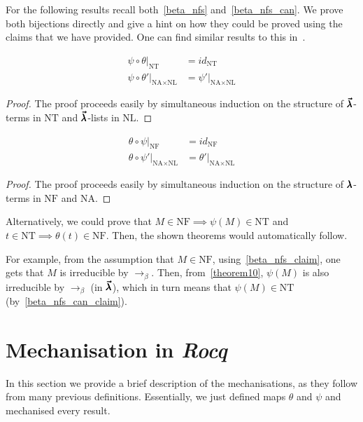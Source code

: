For the following results recall both~\cref{beta_nfs} and~\cref{beta_nfs_can}.
We prove both bijections directly and give a hint on how they could be proved using the claims that we have provided.
One can find similar results to this in~\cite{LuisDychkoff}.

\begin{theorem}
  \begin{align*}
    \psi \circ \theta |_{\text{NT}} &= id_{\text{NT}} \\
    \psi \circ \theta'|_{\text{NA} \times \text{NL}} &= \psi' |_{\text{NA} \times \text{NL}}
  \end{align*}
\end{theorem}
\begin{proof}
  The proof proceeds easily by simultaneous induction on the structure of $\pmb{\vec \lambda}$-terms in $\text{NT}$ and $\pmb{\vec \lambda}$-lists in $\text{NL}$.
\end{proof}

\begin{theorem}
  \begin{align*}
    \theta \circ \psi |_{\text{NF}} &= id_{\text{NF}} \\
    \theta \circ \psi'|_{\text{NA} \times \text{NL}} &= \theta' |_{\text{NA} \times \text{NL}}
  \end{align*}
\end{theorem}
\begin{proof}
  The proof proceeds easily by simultaneous induction on the structure of $\pmb{\lambda}$-terms in $\text{NF}$ and $\text{NA}$.
\end{proof}

Alternatively, we could prove that $M \in \text{NF} \implies \psi(M) \in \text{NT}$ and $t \in \text{NT} \implies \theta(t) \in \text{NF}$. Then, the shown theorems would automatically follow.

For example, from the assumption that $M \in \text{NF}$, using~\cref{beta_nfs_claim}, one gets that $M$ is irreducible by $\to_\beta$.
Then, from~\cref{theorem10}, $\psi(M)$ is also irreducible by $\to_\beta$ (in $\pmb{\vec \lambda}$), which in turn means that $\psi(M) \in \text{NT}$ (by~\cref{beta_nfs_can_claim}).

\section{Mechanisation in \textit{Rocq}}

In this section we provide a brief description of the mechanisations, as they follow from many previous definitions.
Essentially, we just defined maps $\theta$ and $\psi$ and mechanised every result.

